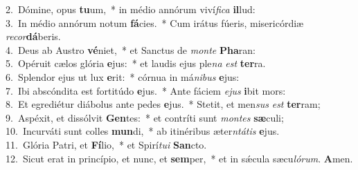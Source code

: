 {2.~}Dómine, opus \textbf{tu}um,~* in médio annórum viví\textit{fi}\textit{ca} \textbf{il}lud:\\
{3.~}In médio annórum notum \textbf{fá}cies.~* Cum irátus fúeris, misericórdiæ \textit{re}\textit{cor}\textbf{dá}beris.\\
{4.~}Deus ab Austro \textbf{vé}niet,~* et Sanctus de \textit{mon}\textit{te} \textbf{Pha}ran:\\
{5.~}Opéruit cælos glória \textbf{e}jus:~* et laudis ejus ple\textit{na} \textit{est} \textbf{ter}ra.\\
{6.~}Splendor ejus ut lux \textbf{e}rit:~* córnua in má\textit{ni}\textit{bus} \textbf{e}jus:\\
{7.~}Ibi abscóndita est fortitúdo \textbf{e}jus.~* Ante fáciem \textit{e}\textit{jus} \textbf{i}bit mors:\\
{8.~}Et egrediétur diábolus ante pedes \textbf{e}jus.~* Stetit, et men\textit{sus} \textit{est} \textbf{ter}ram;\\
{9.~}Aspéxit, et dissólvit \textbf{Gen}tes:~* et contríti sunt \textit{mon}\textit{tes} \textbf{sæ}culi;\\
{10.~}Incurváti sunt colles \textbf{mun}di,~* ab itinéribus æter\textit{ntá}\textit{tis} \textbf{e}jus.\\
{11.~}Glória Patri, et \textbf{Fí}lio,~* et Spirí\textit{tu}\textit{i} \textbf{San}cto.\\
{12.~}Sicut erat in princípio, et nunc, et \textbf{sem}per,~* et in sǽcula sæcu\textit{ló}\textit{rum}. \textbf{A}men.\\
